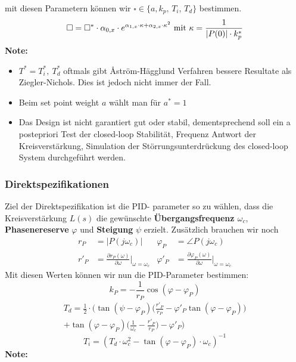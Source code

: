             mit diesen Parametern können wir $\square \in \{a, k_p,\, T_i,\, T_d\}$ bestimmen.
            \[ \square = \square^* \cdot \alpha_{0,x} \cdot e^{\alpha_{1,x} \cdot \kappa + \alpha_{2,x} \cdot \kappa^2}
            \ \textnormal{mit} \ \kappa = \frac{1}{|P(0)| \cdot k_p^*} \]
            \textbf{Note:}
            \begin{itemize}
                \item $T^* = T_i^*,\  T_d^*$ oftmals gibt \r{A}ström-Hägglund Verfahren bessere Resultate als Ziegler-Nichols. Dies ist jedoch nicht immer der Fall. 
                \item Beim set point weight $a$ wählt man für $a^* = 1$ 
                \item Das Design ist nicht garantiert gut oder stabil, dementsprechend soll ein a postepriori Test der closed-loop Stabilität, Frequenz Antwort der Kreisverstärkung, Simulation der Störrungsunterdrückung des closed-loop System durchgeführt werden.
            \end{itemize}
            
    \subsubsection{Direktspezifikationen} 
        Ziel der Direktspezifikation ist die PID- parameter so zu wählen, dass die Kreisverstärkung $L(s)$ die gewünschte \textbf{Übergangsfrequenz $\omega_c$}, \textbf{Phasenereserve} $\varphi$ und \textbf{Steigung} $\psi$ erzielt. Zusätzlich brauchen wir noch 
        \begin{align*}
        r_P &= |P(j\omega_c)|   &   \varphi_P &= \angle P(j\omega_c)\\
        r'_P &= \frac{\partial r_P(\omega)}{\partial\omega}\Bigg|_{\omega=\omega_c} & \varphi'_P &= \frac{\partial \varphi_P(\omega)}{\partial\omega}\Bigg |_{\omega=\omega_c}
        \end{align*}
        Mit diesen Werten können wir nun die PID-Parameter bestimmen:
        \[k_P = - \frac{1}{r_P}\cos(\varphi-\varphi_P)\]
        \begin{multline*}
        T_d =\frac{1}{2}\cdot\Bigg(\tan(\psi-\varphi_P)\Bigg(\frac{r'_P}{r_P}-\varphi'_P\tan(\varphi-\varphi_P)\Bigg)\\ + \tan(\varphi-\varphi_P) \Bigg(\frac{1}{\omega_c}-\frac{r'_P}{r_P}\Bigg)- \varphi'_P\Bigg)
        \end{multline*}
        \[T_i = (T_d\cdot \omega_c^2 - \tan(\varphi-\varphi_P)\cdot \omega_c)^{-1}\]
        \textbf{Note:}
        
